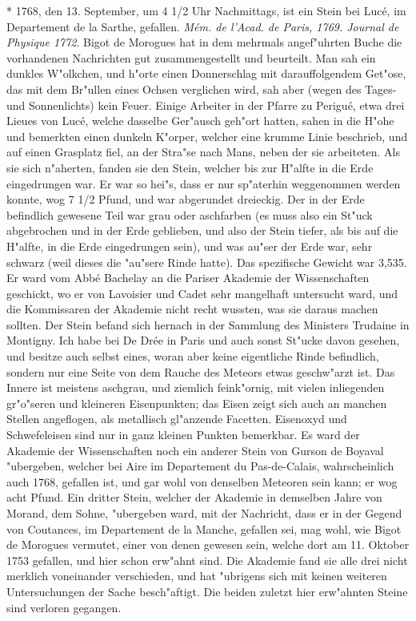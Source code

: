 \documentclass[a4paper, 11pt, oneside, polutonikogreek, german]{article}
\begin{document}
* 1768, den 13. September, um 4 1/2 Uhr Nachmittags, ist ein Stein bei Lucé, im Departement de la Sarthe, gefallen. \emph{Mém. de l'Acad. de Paris, 1769. Journal de Physique 1772}. Bigot de Morogues hat in dem mehrmals angef"uhrten Buche die vorhandenen Nachrichten gut zusammengestellt und beurteilt. Man sah ein dunkles W"olkchen, und h"orte einen Donnerschlag mit darauffolgendem Get"ose, das mit dem Br"ullen eines Ochsen verglichen wird, sah aber (wegen des Tages- und Sonnenlichts) kein Feuer. Einige Arbeiter in der Pfarre zu Perigué, etwa drei Lieues von Lucé, welche dasselbe Ger"ausch geh"ort hatten, sahen in die H"ohe und bemerkten einen dunkeln K"orper, welcher eine krumme Linie beschrieb, und auf einen Grasplatz fiel, an der Stra"se nach Mans, neben der sie arbeiteten. Als sie sich n"aherten, fanden sie den Stein, welcher bis zur H"alfte in die Erde eingedrungen war. Er war so hei"s, dass er nur sp"aterhin weggenommen werden konnte, wog 7 1/2 Pfund, und war abgerundet dreieckig. Der in der Erde befindlich gewesene Teil war grau oder aschfarben (es muss also ein St"uck abgebrochen und in der Erde geblieben, und also der Stein tiefer, als bis auf die H"alfte, in die Erde eingedrungen sein), und was au"ser der Erde war, sehr schwarz (weil dieses die "au"sere Rinde hatte). Das spezifische Gewicht war 3,535. Er ward vom Abbé Bachelay an die Pariser Akademie der Wissenschaften geschickt, wo er von Lavoisier und Cadet sehr mangelhaft untersucht ward, und die Kommissaren der Akademie nicht recht wussten, was sie daraus machen sollten. Der Stein befand sich hernach in der Sammlung des Ministers Trudaine in Montigny. Ich habe bei De Drée in Paris und auch sonst St"ucke davon gesehen, und besitze auch selbst eines, woran aber keine eigentliche Rinde befindlich, sondern nur eine Seite von dem Rauche des Meteors etwas geschw"arzt ist. Das Innere ist meistens aschgrau, und ziemlich feink"ornig, mit vielen inliegenden gr"o"seren und kleineren Eisenpunkten; das Eisen zeigt sich auch an manchen Stellen angeflogen, als metallisch gl"anzende Facetten. Eisenoxyd und Schwefeleisen sind nur in ganz kleinen Punkten bemerkbar. Es ward der Akademie der Wissenschaften noch ein anderer Stein von Gurson de Boyaval "ubergeben, welcher bei Aire im Departement du Pas-de-Calais, wahrscheinlich auch 1768, gefallen ist, und gar wohl von denselben Meteoren sein kann; er wog acht Pfund. Ein dritter Stein, welcher der Akademie in demselben Jahre von Morand, dem Sohne, "ubergeben ward, mit der Nachricht, dass er in der Gegend von Coutances, im Departement de la Manche, gefallen sei, mag wohl, wie Bigot de Morogues vermutet, einer von denen gewesen sein, welche dort am 11. Oktober 1753 gefallen, und hier schon erw"ahnt sind. Die Akademie fand sie alle drei nicht merklich voneinander verschieden, und hat "ubrigens sich mit keinen weiteren Untersuchungen der Sache besch"aftigt. Die beiden zuletzt hier erw"ahnten Steine sind verloren gegangen.
\end{document}
